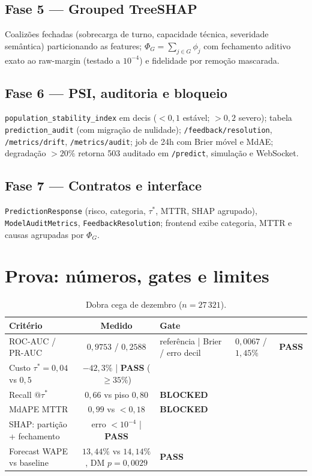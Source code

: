 \documentclass[11pt,a4paper]{article}
\begin{document}
\subsection{Fase 5 — Grouped TreeSHAP}
Coalizões fechadas (sobrecarga de turno, capacidade técnica, severidade
semântica) particionando as features; $\Phi_G=\sum_{j\in G}\phi_j$ com
fechamento aditivo exato ao raw-margin (testado a $10^{-4}$) e fidelidade por
remoção mascarada.

\subsection{Fase 6 — PSI, auditoria e bloqueio}
\texttt{population\_stability\_index} em decis ($<0{,}1$ estável; $>0{,}2$
severo); tabela \texttt{prediction\_audit} (com migração de nulidade);
\texttt{/feedback/resolution}, \texttt{/metrics/drift},
\texttt{/metrics/audit}; job de 24h com Brier móvel e MdAE; degradação $>20\%$
retorna 503 auditado em \texttt{/predict}, simulação e WebSocket.

\subsection{Fase 7 — Contratos e interface}
\texttt{PredictionResponse} (risco, categoria, $\tau^*$, MTTR, SHAP agrupado),
\texttt{ModelAuditMetrics}, \texttt{FeedbackResolution}; frontend exibe
categoria, MTTR e causas agrupadas por $\Phi_G$.

\section{Prova: números, gates e limites}

\begin{table}[h]
\centering
\caption{Dobra cega de dezembro ($n=27\,321$).}
\begin{tabular}{@{}lcl@{}}
\toprule
Critério & Medido & Gate \\
\midrule
ROC-AUC / PR-AUC & $0{,}9753$ / $0{,}2588$ & referência |
Brier / erro decil & $0{,}0067$ / $1{,}45\%$ & \textbf{PASS} \\
Custo $\tau^*=0{,}04$ vs $0{,}5$ & $-42{,}3\%$ | \textbf{PASS} ($\ge35\%$) \\
Recall $@\tau^*$ & $0{,}66$ vs piso $0{,}80$ & \textbf{BLOCKED} \\
MdAPE MTTR & $0{,}99$ vs $<0{,}18$ & \textbf{BLOCKED} \\
SHAP: partição + fechamento & erro $<10^{-4}$ | \textbf{PASS} \\
Forecast WAPE vs baseline & $13{,}44\%$ vs $14{,}14\%$, DM $p{=}0{,}0029$ & \textbf{PASS} \\
\bottomrule
\end{tabular}
\end{table}
\end{document}
